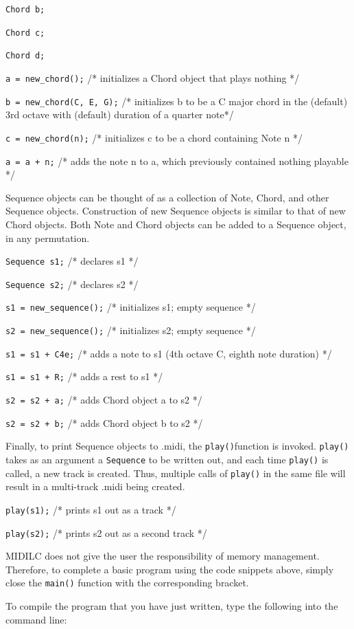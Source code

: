 \documentclass[12pt,A4]{book}
\begin{document}
\verb|Chord b;|

\verb|Chord c;|

\verb|Chord d;|

\verb|a = new_chord();| /* initializes a Chord object that plays nothing */

\verb|b = new_chord(C, E, G);| /* initializes b to be a C major chord in the (default) 3rd octave with (default) duration of a quarter note*/

\verb|c = new_chord(n);| /* initializes c to be a chord containing Note n */

\verb|a = a + n;| /* adds the note n to a, which previously contained nothing playable */

Sequence objects can be thought of as a collection of Note, Chord, and other Sequence objects. Construction of new Sequence objects is similar to that of new Chord objects. Both Note and Chord objects can be added to a Sequence object, in any permutation.

\verb|Sequence s1;| /* declares s1 */

\verb|Sequence s2;| /* declares s2 */

\verb|s1 = new_sequence();|  /* initializes s1; empty sequence */

\verb|s2 = new_sequence();|  /* initializes s2; empty sequence */

\verb|s1 = s1 + C4e;| /* adds a note to s1 (4th octave C, eighth note duration) */

\verb|s1 = s1 + R;| /* adds a rest to s1 */

\verb|s2 = s2 + a;| /* adds Chord object a to s2 */

\verb|s2 = s2 + b;| /* adds Chord object b to s2 */

Finally, to print Sequence objects to .midi, the \verb|play()|function is invoked. \verb|play()| takes as an argument a \verb|Sequence| to be written out, and each time \verb|play()| is called, a new track is created. Thus, multiple calls of \verb|play()| in the same file will result in a multi-track .midi being created.

\verb|play(s1);| /* prints s1 out as a track */

\verb|play(s2);| /* prints s2 out as a second track */

MIDILC does not give the user the responsibility of memory management. Therefore, to complete a basic program using the code snippets above, simply close the \verb|main()| function with the corresponding bracket.

To compile the program that you have just written, type the following into the command line:
\end{document}
